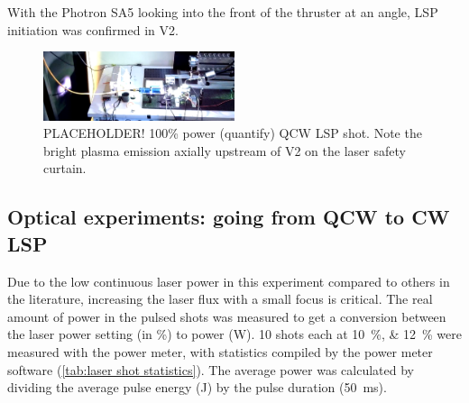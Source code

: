 
            With the Photron SA5 looking into the front of the thruster at an angle, LSP initiation was confirmed in  V2. 

            \begin{figure}[!ht]
                \centering
                \includegraphics[width=0.5\textwidth]{assets/4 experiments/holy jesus look at this.png}
                \caption{ PLACEHOLDER! 100\% power (quantify) QCW LSP shot. Note the bright plasma emission axially upstream of V2 on the laser safety curtain.}
            \end{figure}


        \subsection{Optical experiments: going from QCW to CW LSP}

            Due to the low continuous laser power in this experiment compared to others in the literature, increasing the laser flux with a small focus is critical. The real amount of power in the pulsed shots was measured to get a conversion between the laser power setting (in \%) to power (W). 10 shots each at \qtylist{10; 12}{\%} were measured with the power meter, with statistics compiled by the power meter software (\autoref{tab:laser shot statistics}). The average power was calculated by dividing the average pulse energy (J) by the pulse duration (\qty{50}{ms}).

